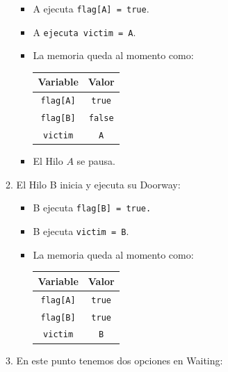 \begin{enumerate}
\begin{enumerate}
            \begin{itemize}
                \item A ejecuta \texttt{flag[A] = true}.
                \item A \texttt{ejecuta victim = A}.
                \item La memoria queda al momento como:
                \begin{center}
                    \begin{tabular}{| c | c |}
                    \hline
                    Variable & Valor \\ \hline
                    \texttt{flag[A]} & \texttt{true} \\
                    \texttt{flag[B]} & \texttt{false} \\
                    \texttt{victim} & \texttt{A} \\ \hline
                    \end{tabular}
                \end{center}
                \item El Hilo $A$ se pausa.
            \end{itemize}
            \item El Hilo B inicia y ejecuta su Doorway:
            \begin{itemize}
                \item B ejecuta \texttt{flag[B] = true.}
                \item B ejecuta \texttt{victim = B}.
                \item La memoria queda al momento como:
                \begin{center}
                    \begin{tabular}{| c | c |}
                    \hline
                    Variable & Valor \\ \hline
                    \texttt{flag[A]} & \texttt{true} \\
                    \texttt{flag[B]} & \texttt{true} \\
                    \texttt{victim} & \texttt{B} \\ \hline
                    \end{tabular}
                \end{center}
            \end{itemize}
            \item En este punto tenemos dos opciones en Waiting:
            \begin{itemize}

\end{itemize}
\end{enumerate}
\end{enumerate}
